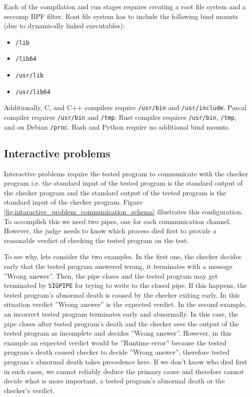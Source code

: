 \documentclass[en]{pracamgr}
\begin{document}
Each of the compilation and run stages requires creating a root file system and a seccomp BPF filter. Root file system has to include the following bind mounts (due to dynamically linked executables):
\begin{itemize}
    \item \texttt{/lib}
    \item \texttt{/lib64}
    \item \texttt{/usr/lib}
    \item \texttt{/usr/lib64}
\end{itemize}

Additionally, C, and C++ compilers require \texttt{/usr/bin} and \texttt{/usr/include}.
Pascal compiler requires \texttt{/usr/bin} and \texttt{/tmp}.
Rust compiler requires \texttt{/usr/bin}, \texttt{/tmp}, and on Debian \texttt{/proc}.
Bash and Python require no additional bind mounts.

\subsection{Interactive problems}

Interactive problems require the tested program to communicate with the checker program i.e. the standard input of the tested program is the standard output of the checker program and the standard output of the tested program is the standard input of the checker program. Figure \ref{fig:intaractive_problem_communication_schema} illustrates this configuration. To accomplish this we need two pipes, one for each communication channel. However, the judge needs to know which process died first to provide a reasonable verdict of checking the tested program on the test.

To see why, lets consider the two examples. In the first one, the checker decides early that the tested program answered wrong, it terminates with a message ''Wrong answer''. Then, the pipe closes and the tested program may get terminated by \texttt{SIGPIPE} for trying to write to the closed pipe. If this happens, the tested program's abnormal death is caused by the checker exiting early. In this situation verdict ''Wrong answer'' is the expected verdict. In the second example, an incorrect tested program terminates early and abnormally. In this case, the pipe closes after tested program's death and the checker sees the output of the tested program as incomplete and decides ''Wrong answer''. However, in this example an expected verdict would be ''Runtime error'' because the tested program's death caused checker to decide ''Wrong answer'', therefore tested program's abnormal death takes precedence here. If we don't know who died first in such cases, we cannot reliably deduce the primary cause and therefore cannot decide what is more important, a tested program's abnormal death or the checker's verdict.
\end{document}
